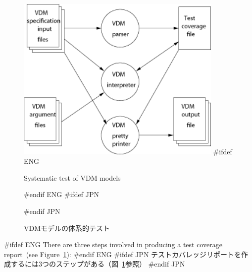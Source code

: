 \documentclass[\pformat,12pt]{article}
\begin{document}
\begin{figure}[tbh]
\begin{center}
\includegraphics[width=10cm]{testenv.png}
#ifdef ENG
\caption{Systematic test of VDM models}
#endif ENG
#ifdef JPN
\caption{VDMモデルの体系的テスト}
#endif JPN
\label{fig:testenv}
\end{center}
\end{figure}

#ifdef ENG
There are three steps involved in producing a test coverage
report~(see Figure~\ref{fig:testenv}):
#endif ENG
#ifdef JPN
テストカバレッジリポートを作成するには3つのステップがある（図~\ref{fig:testenv}参照）
#endif JPN
\end{document}

